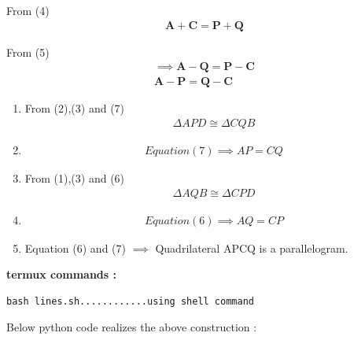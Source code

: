 \documentclass[10pt, a4paper]{article}
\let\vec\mathbf
\begin{document}
From (4)
\begin{align}
    \vec{A}+\vec{C} =\vec{P}+\vec{Q}
\end{align}

From (5)
\begin{align}
     \implies  \vec{A}-\vec{Q} =\vec{P}-\vec{C}\\
    \vec{A}-\vec{P} =\vec{Q}-\vec{C}
\end{align}


\begin{enumerate}
    \item From (2),(3) and (7)
    \begin{align}
        \Delta APD \cong \Delta CQB
    \end{align}
    
    \item \begin{align}
        Equation (7) \implies AP=CQ
    \end{align}
    
     \item From (1),(3) and (6)
    \begin{align}
        \Delta AQB \cong \Delta CPD
    \end{align}

    \item \begin{align}
        Equation (6) \implies AQ=CP
    \end{align}

     \item Equation (6) and (7) 
      $\implies$  Quadrilateral APCQ is a parallelogram.
\end{enumerate}

\iffalse

\textbf{termux commands :}
\begin{lstlisting}
bash lines.sh............using shell command
\end{lstlisting}
\begin{center}
Below python code realizes the above construction :
\end{center}
\end{document}
